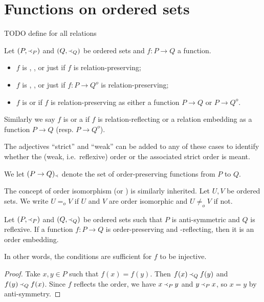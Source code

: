 \section{Functions on ordered sets}
TODO define for all relations
\begin{definition}
Let $(P, \Yleft_P)$ and $(Q, \Yleft_Q)$ be ordered sets and $f: P\to Q$ a function.
\begin{itemize}
\item $f$ is , ,  or just  if $f$ is relation-preserving;
\item $f$ is , ,  or just  if $f: P\to Q^o$ is relation-preserving;
\item $f$ is  or  if $f$ is relation-preserving as either a function $P\to Q$ or $P\to Q^o$.
\end{itemize}
Similarly we say $f$ is  or a  if $f$ is relation-reflecting or a relation embedding as a function $P\to Q$ (resp. $P\to Q^o$).

The adjectives ``strict'' and ``weak'' can be added to any of these cases to identify whether the (weak, i.e.\ reflexive) order or the associated strict order is meant.

We let $(P\to Q)_\Yleft$ denote the set of order-preserving functions from $P$ to $Q$.
\end{definition}
The concept of order isomorphism (or ) is similarly inherited. Let $U,V$ be ordered sets. We write $U =_o V$ if $U$ and $V$ are order isomorphic and $U \neq_o V$ if not.

\begin{lemma}
Let $(P, \Yleft_P)$ and $(Q, \Yleft_Q)$ be ordered sets such that $P$ is anti-symmetric and $Q$ is reflexive. If a function $f: P \to Q$ is order-preserving and -reflecting, then it is an order embedding.
\end{lemma}
In other words, the conditions are sufficient for $f$ to be injective.
\begin{proof}
Take $x,y\in P$ such that $f(x) = f(y)$. Then $f(x) \Yleft_Q f(y)$ and $f(y) \Yleft_Q f(x)$. Since $f$ reflects the order, we have $x \Yleft_P y$ and $y \Yleft_P x$, so $x = y$ by anti-symmetry.
\end{proof}

